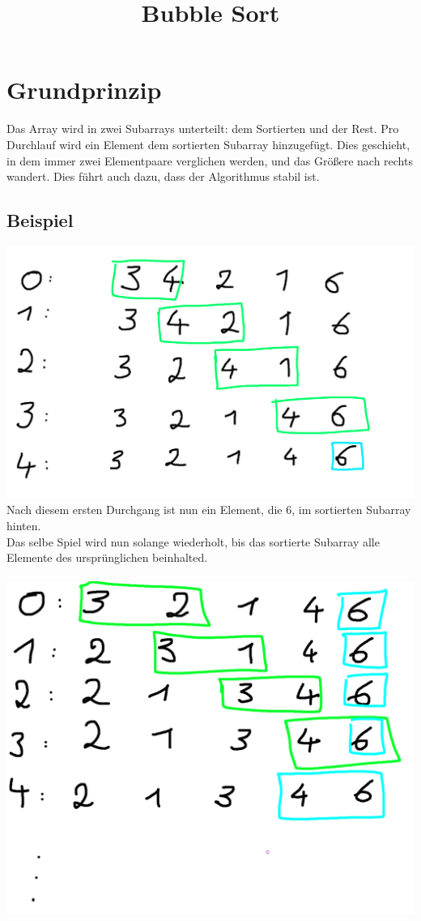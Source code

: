 \documentclass[11pt]{article}
\title{\vspace{-4.7cm}Bubble Sort}
\date{}
\begin{document}
\maketitle
\section{Grundprinzip}
Das Array wird in zwei Subarrays unterteilt: dem Sortierten und der Rest.
Pro Durchlauf wird ein Element dem sortierten Subarray hinzugef\"ugt. Dies geschieht, 
in dem immer zwei Elementpaare verglichen werden, und das Gr\"o{\ss}ere nach rechts wandert. Dies 
f\"uhrt auch dazu, dass der Algorithmus stabil ist.
\subsection{Beispiel}
\includegraphics[scale=0.2]{qwe.png}\\
Nach diesem ersten Durchgang ist nun ein Element, die 6, im sortierten Subarray hinten.\\
Das selbe Spiel wird nun solange wiederholt, bis das sortierte Subarray alle Elemente des
urspr\"unglichen beinhalted.\\
\vspace{0.5cm}\\
\includegraphics[scale=0.25]{qwe2.png}\\
\end{document}
